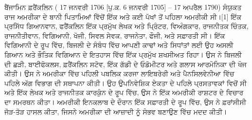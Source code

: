 \documentclass[a4paper,12pt,oneside,final]{article}
\begin{document}
ਬੈਂਜਾਮਿਨ ਫ਼ਰੈਂਕਲਿਨ ( 17 ਜਨਵਰੀ 1706 [ਪੁ.ਕ. 6 ਜਨਵਰੀ 1705] – 17 ਅਪਰੈਲ 1790) ਸੰਯੁਕਤ ਰਾਜ ਅਮਰੀਕਾ ਦੇ ਬਾਨੀ ਪਿਤਾਮਿਆਂ ਵਿੱਚੋਂ ਇੱਕ ਅਤੇ ਕਈ ਪੱਖਾਂ ਤੋਂ ਪਹਿਲਾ ਅਮਰੀਕੀ ਸੀ।[1] ਇੱਕ ਪ੍ਰਸਿੱਧ ਗਿਆਨਵਾਨ, ਫਰੈਂਕਲਿਨ ਇੱਕ ਪ੍ਰਮੁੱਖ ਲੇਖਕ ਅਤੇ ਪ੍ਰਿੰਟਰ, ਵਿਅੰਗਕਾਰ, ਰਾਜਨੀਤਕ ਚਿੰਤਕ, ਰਾਜਨੀਤੀਵਾਨ, ਵਿਗਿਆਨੀ, ਖੋਜੀ, ਸਿਵਲ ਸੇਵਕ, ਰਾਜਨੇਤਾ, ਫੌਜੀ, ਅਤੇ ਸਫ਼ਾਰਤੀ ਸੀ। ਇੱਕ ਵਿਗਿਆਨੀ ਦੇ ਰੂਪ ਵਿੱਚ, ਬਿਜਲੀ ਦੇ ਸੰਬੰਧ ਵਿੱਚ ਆਪਣੀ ਕਾਢਾਂ ਅਤੇ ਸਿਧਾਂਤਾਂ ਲਈ ਉਹ ਅਸਲੀ ਗਿਆਨ ਅਤੇ ਭੌਤਿਕ ਵਿਗਿਆਨ ਦੇ ਇਤਹਾਸ ਵਿੱਚ ਇੱਕ ਪ੍ਰਮੁੱਖ ਸ਼ਖਸੀਅਤ ਰਿਹਾ। ਉਸ ਨੇ ਬਿਜਲੀ ਦੀ ਛੜੀ, ਬਾਈਫੋਕਲਸ, ਫ਼ਰੈਂਕਲਿਨ ਸਟੋਵ, ਇੱਕ ਗੱਡੀ ਦੇ ਓਡੋਮੀਟਰ ਅਤੇ ਗਲਾਸ ਆਰਮੋਨਿਕਾ ਦੀ ਖੋਜ ਕੀਤੀ। ਉਸ ਨੇ ਅਮਰੀਕਾ ਵਿੱਚ ਪਹਿਲੀ ਪਬਲਿਕ ਕਰਜਾ ਲਾਇਬਰੇਰੀ ਅਤੇ ਪੈਨਸਿਲਵੇਨੀਆ ਵਿੱਚ ਪਹਿਲੇ ਅੱਗ ਵਿਭਾਗ ਦੀ ਸਥਾਪਨਾ ਕੀਤੀ। ਉਹ ਉਪਨਿਵੇਸ਼ਿਕ ਏਕਤਾ ਦੇ ਪਹਿਲੇ ਪ੍ਰਸਤਾਵਕਾਂ ਵਿਚੋਂ ਸੀ ਅਤੇ ਇੱਕ ਲੇਖਕ ਅਤੇ ਰਾਜਨੀਤਕ ਕਾਰਕੁੰਨ ਦੇ ਰੂਪ ਵਿੱਚ, ਉਸ ਨੇ ਇੱਕ ਅਮਰੀਕੀ ਰਾਸ਼ਟਰ ਦੇ ਵਿਚਾਰ ਦਾ ਸਮਰਥਨ ਕੀਤਾ। ਅਮਰੀਕੀ ਇਨਕਲਾਬ ਦੇ ਦੌਰਾਨ ਇੱਕ ਸਫ਼ਾਰਤੀ ਦੇ ਰੂਪ ਵਿੱਚ, ਉਸ ਨੇ ਫ਼ਰਾਂਸੀਸੀ ਜੋੜ-ਤੋੜ ਹਾਸਲ ਕੀਤਾ, ਜਿਸਨੇ ਅਮਰੀਕਾ ਦੀ ਆਜ਼ਾਦੀ ਨੂੰ ਸੰਭਵ ਬਣਾਉਣ ਵਿੱਚ ਮਦਦ ਕੀਤੀ।
\end{document}
